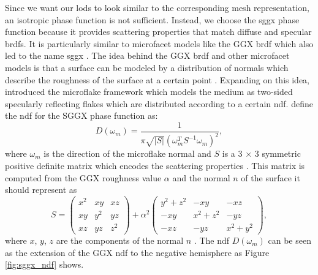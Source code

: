 Since we want our \acp{lod} to look similar to the corresponding mesh representation, an isotropic phase function is not sufficient.
Instead, we choose the \acs{sggx} phase function \cite{sggx} because it provides scattering properties that match diffuse and specular \acsp{brdf}.
It is particularly similar to microfacet models like the GGX \acs{brdf} \cite{ggx} which also led to the name \acf{sggx} \cite{sggx}.
The idea behind the GGX \ac{brdf} and other microfacet models is that a surface can be modeled by a distribution of normals which describe the roughness of the surface at a certain point \cite{ggx}.
Expanding on this idea, \citeauthor{microflake} \cite{microflake} introduced the microflake framework which models the medium as two-sided specularly reflecting flakes which are distributed according to a certain \ac{ndf}.
\citeauthor{sggx} \cite{sggx} define the \ac{ndf} for the SGGX phase function as:
\begin{equation*}
    D(\omega_m)=\frac{1}{\pi \sqrt{|S|}(\omega_m^T S^{-1} \omega_m)^2},
\end{equation*}
where $\omega_m$ is the direction of the microflake normal and $S$ is a 3 $\times$ 3 symmetric positive definite matrix which encodes the scattering properties \cite{sggx}.
This matrix is computed from the GGX roughness value $\alpha$ and the normal $n$ of the surface it should represent as
\begin{equation*}
    S=\begin{pmatrix}x^2 & xy & xz \\ xy & y^2 & yz \\ xz & yz & z^2\end{pmatrix} + \alpha^2\begin{pmatrix}y^2 + z^2 & -xy & -xz \\ -xy & x^2+z^2 & -yz \\ -xz & -yz & x^2+y^2\end{pmatrix},
\end{equation*}
where $x$, $y$, $z$ are the components of the normal $n$ \cite{sggx}.
The \ac{ndf} $D(\omega_m)$ can be seen as the extension of the GGX \acs{ndf} to the negative hemisphere as Figure \ref{fig:sggx_ndf} shows.
